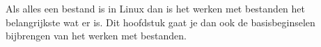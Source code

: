 Als alles een bestand is in Linux dan is het werken met bestanden het belangrijkste wat er is. Dit hoofdstuk gaat je dan ook de basisbeginselen bijbrengen van het werken met bestanden.
